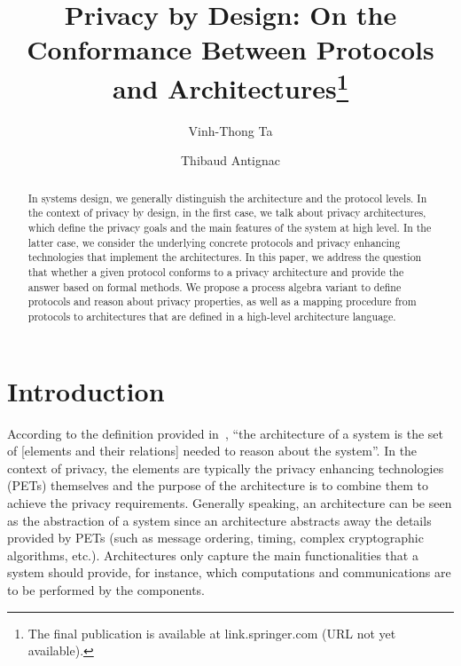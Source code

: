 \documentclass{llncs}
\begin{document}
\newtheorem{ttd}{Definition}
\newtheorem{ttt}{Theorem}
\newtheorem{ttl}{Lemma}
\newtheorem{tta}{Algorithm}
\newtheorem{ttc}{Corollary}
\newtheorem{ttp}{Property}


\mainmatter  

\title{Privacy by Design: On the Conformance Between Protocols and Architectures\protect\footnote{The final publication is available at link.springer.com (URL not yet available).}}

\author{Vinh-Thong Ta \and Thibaud Antignac}




\maketitle

\begin{abstract}
In systems design, we generally distinguish the architecture and 
the protocol levels. In the context of privacy by design, in the first case, 
we talk about privacy architectures, which define the privacy goals and 
the main features of the system at high level. In the latter case, we consider 
the underlying concrete protocols and privacy enhancing technologies  
that implement the architectures. In this paper, we address the question that 
whether a given protocol conforms to a privacy architecture and provide the 
answer based on formal methods. We propose a process algebra variant to define 
protocols and reason about privacy properties, as well as a mapping procedure 
from protocols to architectures that  are defined in a high-level architecture 
language. 
\end{abstract}

\section{Introduction} 
According to the definition provided in~\cite{bass:2012}, ``the architecture of a system is the set of [elements 
and their relations] needed to reason about the system''. In the context of privacy, the elements are typically 
the privacy enhancing technologies (PETs) themselves and the purpose of the architecture is to combine them to 
achieve the privacy requirements. Generally speaking, an architecture can be seen as the abstraction of a system 
since an architecture abstracts away the details provided by PETs (such as message ordering, timing, complex 
cryptographic algorithms, etc.). Architectures only capture the main functionalities that a system should 
provide, for instance, which computations and communications are to be performed by the components.
\end{document}
